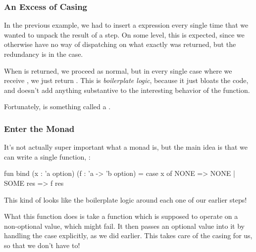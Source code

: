 \documentclass[aspectratio=169]{beamer}
\begin{document}
\begin{frame}[fragile]
  \frametitle{An Excess of Casing}

  In the previous example, we had to insert a  expression every single
  time that we wanted to unpack the result of a step. On some level, this is expected,
  since we otherwise have no way of dispatching on what exactly was returned, but the
  redundancy is in the  case.

  \pause
  \vspace{\fill}

  When  is returned, we proceed as normal, but in every single case where we
  receive , we just return . This is \textit{boilerplate logic},
  because it just bloats the code, and doesn't add anything substantive to the interesting
  behavior of the function.

  \pause
  \vspace{\fill}

  Fortunately,  is something called a .

  \pause
  \vspace{\fill}

\end{frame}

\begin{frame}[fragile]
  \frametitle{Enter the Monad}

  \tgs

  It's not actually super important what a monad is, but the main idea is that we can
  write a single function, :

  \pause
  \begin{codeblock}
    fun bind (x : 'a option) (f : 'a -> 'b option) =
      case x of
        NONE => NONE
      | SOME res => f res
  \end{codeblock}

  \pause
  \vspace{\fill}

  This kind of looks like the boilerplate logic around each one of our earlier steps!

  \pause
  \vspace{\fill}

  What this function does is take a function which is supposed to operate on a non-optional
  value, which might fail. It then passes an optional value into it by handling the
   case explicitly, as we did earlier. This takes care of the casing for us,
  so that we don't have to!
\end{frame}
\end{document}
